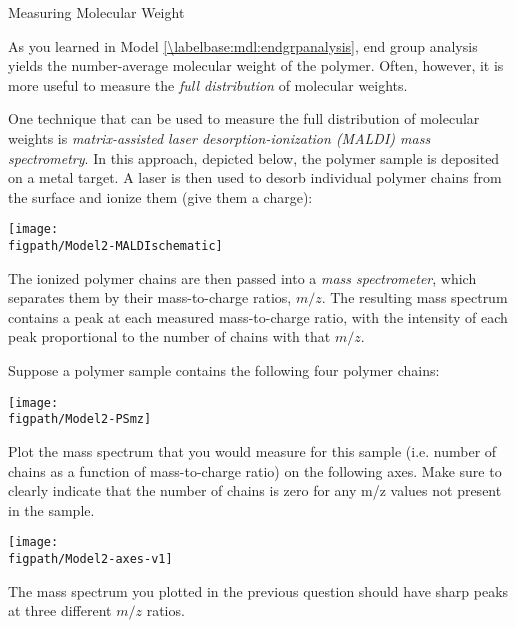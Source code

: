 \begin{activity}{Measuring Molecular Weight}
\begin{ctqs}
\end{ctqs}



\begin{model}
	\label{\labelbase:mdl:MALDI}

	As you learned in Model \ref{\labelbase:mdl:endgrpanalysis}, end group analysis yields the number-average molecular weight of the polymer.  Often, however, it is more useful to measure the \emph{full distribution} of molecular weights.
	
	One technique that can be used to measure the full distribution of molecular weights is \emph{matrix-assisted laser desorption-ionization (MALDI) mass spectrometry}.  In this approach, depicted below, the polymer sample is deposited on a metal target.  A laser is then used to desorb individual polymer chains from the surface and ionize them (give them a charge):   
	
	\vspace{12pt}
	\centerline{\texttt{[image: \\figpath/Model2-MALDIschematic]}}
	
	The ionized polymer chains are then passed into a \emph{mass spectrometer}, which separates them by their mass-to-charge ratios, $m/z$.  The resulting mass spectrum contains a peak at each measured mass-to-charge ratio, with the intensity of each peak proportional to the number of chains with that $m/z$. 

\end{model}

\begin{ctqs}

	\question Suppose a polymer sample contains the following four polymer chains: \label{\labelbase:ctq:PS-MALDI}
	
			\centerline{\texttt{[image: \\figpath/Model2-PSmz]}}
	
		Plot the mass spectrum that you would measure for this sample (i.e. number of chains as a function of mass-to-charge ratio) on the following axes.  Make sure to clearly indicate that the number of chains is zero for any m/z values not present in the sample.
		
			\vspace{12pt}
			\centerline{\texttt{[image: \\figpath/Model2-axes-v1]}}
			
	\clearpage
	\question The mass spectrum you plotted in the previous question should have sharp peaks at three different $m/z$ ratios.
	

\end{ctqs}
\end{activity}
